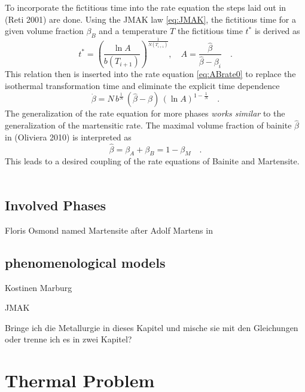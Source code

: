 
To incorporate the fictitious time into the rate equation the steps laid out in (Reti 2001) are done. Using the JMAK law \ref{eq:JMAK}, the fictitious time for a given volume fraction $\beta_B$ and a temperature $T$ the fictitious time $t^\ast$ is derived as 
\begin{equation}
	t^\ast = \left( \frac{\ln A}{b(T_{i+1})}\right)^\frac{1}{N(T_{i+1})}, \quad A = \frac{\hat{\beta}}{\hat{\beta}-\beta_i}  \quad.
\end{equation}
This relation then is inserted into the rate equation \ref{eq:ABrate0} to replace the isothermal transformation time and eliminate the explicit time dependence 
\begin{equation}
	\dot{\beta} = N\,b^{\frac{1}{N}}\,(\hat{\beta}-\beta)\,\left(\ln A \right)^{1-\frac{1}{N}}\quad. \label{eq:ABrate}
\end{equation}
The generalization of the rate equation for more phases \textit{works similar} to the generalization of the martensitic rate. The maximal volume fraction of bainite $\hat{\beta}$ in (Oliviera 2010) is interpreted as 
\begin{equation}
	\hat{\beta} = \beta_A + \beta_B = 1 - \beta_M \quad. 
\end{equation}
This leads to a desired coupling of the rate equations of Bainite and Martensite. \\\\





\subsection{Involved Phases}
Floris Osmond named Martensite after Adolf Martens in \cite{osmond_microscopic_1904}

\subsection{phenomenological models}
Kostinen Marburg

JMAK 


Bringe ich die Metallurgie in dieses Kapitel und mische sie mit den Gleichungen oder trenne ich es in zwei Kapitel? 


\section{Thermal Problem}

